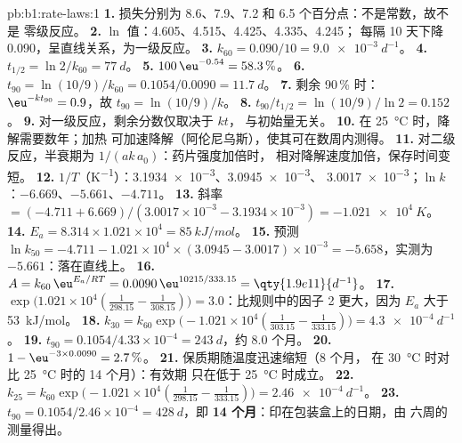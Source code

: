 \begin{solution}{pb:b1:rate-laws:1}
\textbf{1.} 损失分别为 8.6、7.9、7.2 和 6.5 个百分点：不是常数，故不是
零级反应。
\textbf{2.} $\ln$ 值：4.605、4.515、4.425、4.335、4.245；
每隔 10 天下降 0.090，呈直线关系，为一级反应。
\textbf{3.} $k_{60} = 0.090/10 = \qty{9.0e-3}{d^{-1}}$。
\textbf{4.} $t_{1/2} = \ln2/k_{60} = \qty{77}{d}$。
\textbf{5.} $100\,\eu^{-0.54} = 58.3\,\%$。
\textbf{6.} $t_{90} = \ln(10/9)/k_{60} = 0.1054/0.0090 = \qty{11.7}{d}$。
\textbf{7.} 剩余 90\,\% 时：$\eu^{-kt_{90}} = 0.9$，故 $t_{90} = \ln(10/9)/k$。
\textbf{8.} $t_{90}/t_{1/2} = \ln(10/9)/\ln2 = 0.152$。
\textbf{9.} 对一级反应，剩余分数仅取决于 $kt$，
与初始量无关。
\textbf{10.} 在 \qty{25}{\celsius} 时，降解需要数年；加热
可加速降解（阿伦尼乌斯），使其可在数周内测得。
\textbf{11.} 对二级反应，半衰期为 $1/(ak\,a_0)$：药片强度加倍时，
相对降解速度加倍，保存时间变短。
\textbf{12.} $1/T$（\unit{K^{-1}}）：\num{3.1934e-3}、\num{3.0945e-3}、
\num{3.0017e-3}；$\ln k$：$-6.669$、$-5.661$、$-4.711$。
\textbf{13.} 斜率 $= (-4.711 + 6.669)/(3.0017 \times 10^{-3} - 3.1934 \times
10^{-3}) = \qty{-1.021e4}{K}$。
\textbf{14.} $E_a = 8.314 \times 1.021 \times 10^4 = \qty{85}{kJ/mol}$。
\textbf{15.} 预测 $\ln k_{50} = -4.711 - 1.021 \times 10^4 \times (3.0945 -
3.0017) \times 10^{-3} = -5.658$，实测为 $-5.661$：落在直线上。
\textbf{16.} $A = k_{60}\,\eu^{E_a/RT} = 0.0090\,\eu^{10215/333.15} =
\qty{1.9e11}{d^{-1}}$。
\textbf{17.} $\exp\big(1.021 \times 10^4(\frac{1}{298.15} -
\frac{1}{308.15})\big) = 3.0$：比规则中的因子 2 更大，因为
$E_a$ 大于 \qty{53}{kJ/mol}。
\textbf{18.} $k_{30} = k_{60}\exp\big(-1.021 \times 10^4(\frac{1}{303.15} -
\frac{1}{333.15})\big) = \qty{4.3e-4}{d^{-1}}$。
\textbf{19.} $t_{90} = 0.1054/4.33 \times 10^{-4} = \qty{243}{d}$，约 8.0
个月。
\textbf{20.} $1 - \eu^{-3 \times 0.0090} = 2.7\,\%$。
\textbf{21.} 保质期随温度迅速缩短（8 个月，
在 \qty{30}{\celsius} 时对比 \qty{25}{\celsius} 时的 14 个月）：有效期
只在低于 \qty{25}{\celsius} 时成立。
\textbf{22.} $k_{25} = k_{60}\exp\big(-1.021 \times 10^4(\frac{1}{298.15} -
\frac{1}{333.15})\big) = \qty{2.46e-4}{d^{-1}}$。
\textbf{23.} $t_{90} = 0.1054/2.46 \times 10^{-4} = \qty{428}{d}$，即
\textbf{14 个月}：印在包装盒上的日期，由
六周的测量得出。
\end{solution}
